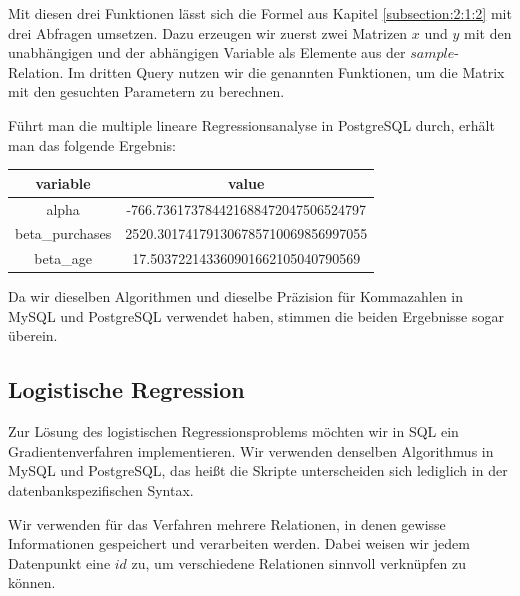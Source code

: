 Mit diesen drei Funktionen lässt sich die Formel aus Kapitel \ref{subsection:2:1:2} mit drei Abfragen umsetzen. Dazu erzeugen wir zuerst zwei Matrizen $x$ und $y$ mit den unabhängigen und der abhängigen Variable als Elemente aus der $sample$-Relation. Im dritten Query nutzen wir die genannten Funktionen, um die Matrix mit den gesuchten Parametern zu berechnen.

Führt man die multiple lineare Regressionsanalyse in PostgreSQL durch, erhält man das folgende Ergebnis:

\begin{center}
  \begin{tabular}{|c|c|}\hline
    \textbf{variable} & \textbf{value} \\ \hline
    alpha & -766.736173784421688472047506524797 \\ \hline
    beta\_purchases & 2520.301741791306785710069856997055 \\ \hline
    beta\_age & 17.503722143360901662105040790569 \\ \hline
  \end{tabular}
\end{center}

Da wir dieselben Algorithmen und dieselbe Präzision für Kommazahlen in MySQL und PostgreSQL verwendet haben, stimmen die beiden Ergebnisse sogar überein.

\subsection{Logistische Regression}
\label{subsection:3:4:3}

Zur Lösung des logistischen Regressionsproblems möchten wir in SQL ein Gradientenverfahren implementieren. Wir verwenden denselben Algorithmus in MySQL und PostgreSQL, das heißt die Skripte unterscheiden sich lediglich in der datenbankspezifischen Syntax.

Wir verwenden für das Verfahren mehrere Relationen, in denen gewisse Informationen gespeichert und verarbeiten werden. Dabei weisen wir jedem Datenpunkt eine $id$ zu, um verschiedene Relationen sinnvoll verknüpfen zu können.


